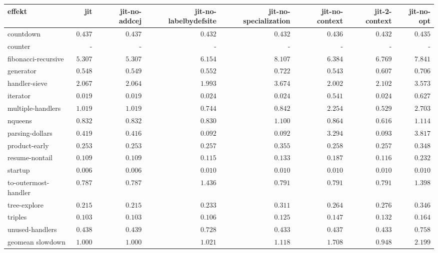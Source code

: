 \begin{tabular}{l r r r r r r r}
\toprule effekt & jit & jit-no-addcej & jit-no-labelbydefsite & jit-no-specialization & jit-no-context & jit-2-context & jit-no-opt \\
\midrule
countdown & $0.437$ & $0.437$ & $0.432$ & $\mathbf{0.432}$ & $0.436$ & $0.432$ & $0.435$ \\
counter & - & - & - & - & - & - & - \\
fibonacci-recursive & $5.307$ & $\mathbf{5.307}$ & $6.154$ & $8.107$ & $6.384$ & $6.769$ & $7.841$ \\
generator & $0.548$ & $0.549$ & $0.552$ & $0.722$ & $\mathbf{0.543}$ & $0.607$ & $0.706$ \\
handler-sieve & $2.067$ & $2.064$ & $\mathbf{1.993}$ & $3.674$ & $2.002$ & $2.102$ & $3.573$ \\
iterator & $\mathbf{0.019}$ & $0.019$ & $0.024$ & $0.024$ & $0.541$ & $0.024$ & $0.627$ \\
multiple-handlers & $1.019$ & $1.019$ & $0.744$ & $0.842$ & $2.254$ & $\mathbf{0.529}$ & $2.703$ \\
nqueens & $0.832$ & $0.832$ & $0.830$ & $1.100$ & $0.864$ & $\mathbf{0.616}$ & $1.114$ \\
parsing-dollars & $0.419$ & $0.416$ & $\mathbf{0.092}$ & $0.092$ & $3.294$ & $0.093$ & $3.817$ \\
product-early & $0.253$ & $\mathbf{0.253}$ & $0.257$ & $0.355$ & $0.258$ & $0.257$ & $0.348$ \\
resume-nontail & $\mathbf{0.109}$ & $0.109$ & $0.115$ & $0.133$ & $0.187$ & $0.116$ & $0.232$ \\
startup & $0.006$ & $\mathbf{0.006}$ & $0.010$ & $0.010$ & $0.010$ & $0.010$ & $0.010$ \\
to-outermost-handler & $0.787$ & $\mathbf{0.787}$ & $1.436$ & $0.791$ & $0.791$ & $0.791$ & $1.398$ \\
tree-explore & $\mathbf{0.215}$ & $0.215$ & $0.233$ & $0.311$ & $0.264$ & $0.276$ & $0.346$ \\
triples & $\mathbf{0.103}$ & $0.103$ & $0.106$ & $0.125$ & $0.147$ & $0.132$ & $0.164$ \\
unused-handlers & $0.438$ & $0.439$ & $0.728$ & $0.433$ & $0.437$ & $\mathbf{0.433}$ & $0.758$ \\
\midrule
 geomean slowdown & $1.000$ & $1.000$ & $1.021$ & $1.118$ & $1.708$ & $0.948$ & $2.199$ \\
\bottomrule
\end{tabular}